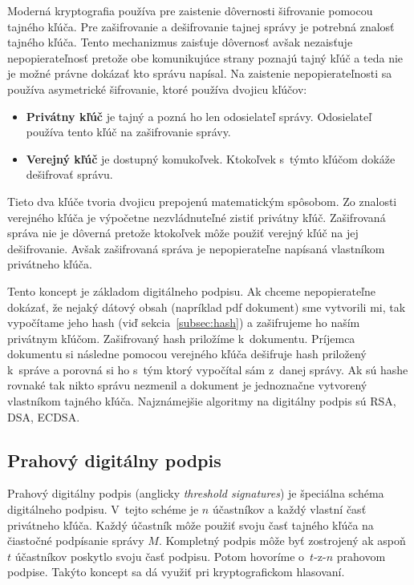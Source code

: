Moderná kryptografia používa pre zaistenie dôvernosti šifrovanie pomocou tajného kľúča. Pre zašifrovanie a dešifrovanie tajnej správy je potrebná znalosť tajného kľúča. Tento mechanizmus  zaisťuje dôvernosť avšak nezaisťuje nepopierateľnosť pretože obe komunikujúce strany poznajú tajný kľúč a teda nie je možné právne dokázať kto správu napísal. Na zaistenie nepopierateľnosti sa používa asymetrické šifrovanie, ktoré používa dvojicu kľúčov:
\begin{itemize}
	\item \textbf{Privátny kľúč} je tajný a pozná ho len odosielateľ správy. Odosielateľ používa tento kľúč na zašifrovanie správy.
	\item \textbf{Verejný kľúč} je dostupný komukoľvek. Ktokoľvek s~týmto kľúčom dokáže dešifrovať správu.
\end{itemize}
Tieto dva kľúče tvoria dvojicu prepojenú matematickým spôsobom. Zo znalosti verejného kľúča je výpočetne nezvládnuteľné zistiť privátny kľúč. Zašifrovaná správa nie je dôverná pretože ktokoľvek môže použiť verejný kľúč na jej dešifrovanie. Avšak zašifrovaná správa je nepopierateľne napísaná vlastníkom privátneho kľúča. 

Tento koncept je základom digitálneho podpisu. Ak chceme nepopierateľne dokázať, že nejaký dátový obsah (napríklad pdf dokument) sme vytvorili mi, tak vypočítame jeho hash (viď sekcia~\ref{subsec:hash}) a zašifrujeme ho naším privátnym kľúčom. Zašifrovaný hash priložíme k~dokumentu. Príjemca dokumentu si následne pomocou verejného kľúča dešifruje hash priložený k~správe a porovná si ho s~tým ktorý vypočítal sám z~danej správy. Ak sú hashe rovnaké tak nikto správu nezmenil a dokument je jednoznačne vytvorený vlastníkom tajného kľúča. Najznámejšie algoritmy na digitálny podpis sú RSA, DSA, ECDSA.~\cite{cryptoHandbook}

\subsection{Prahový digitálny podpis}\label{subsec:threshold-sig}
Prahový digitálny podpis (anglicky \textit{threshold signatures}) je špeciálna schéma digitálneho podpisu. V~tejto schéme je $n$ účastníkov a každý vlastní časť privátneho kľúča. Každý účastník môže použiť svoju časť tajného kľúča na čiastočné podpísanie správy $M$. Kompletný podpis môže byť zostrojený ak aspoň $t$ účastníkov poskytlo svoju časť podpisu. Potom hovoríme o~$t$-z-$n$ prahovom podpise. Takýto koncept sa dá využiť pri kryptografickom hlasovaní.~\cite{blsSignature}


